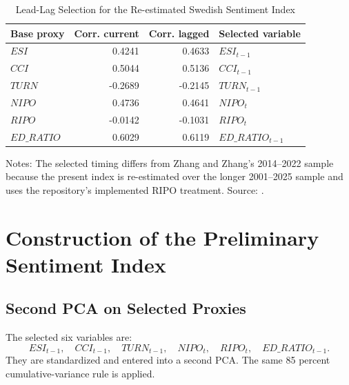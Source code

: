\documentclass[12pt]{article}
\begin{document}
\begin{table}[htbp]
\centering
\caption{Lead-Lag Selection for the Re-estimated Swedish Sentiment Index}
\label{tab:lead_lag_selection}
\begin{tabular}{lrrl}
\toprule
Base proxy & Corr. current & Corr. lagged & Selected variable \\
\midrule
\(ESI\) & 0.4241 & 0.4633 & \(ESI_{t-1}\) \\
\(CCI\) & 0.5044 & 0.5136 & \(CCI_{t-1}\) \\
\(TURN\) & -0.2689 & -0.2145 & \(TURN_{t-1}\) \\
\(NIPO\) & 0.4736 & 0.4641 & \(NIPO_t\) \\
\(RIPO\) & -0.0142 & -0.1031 & \(RIPO_t\) \\
\(ED\_RATIO\) & 0.6029 & 0.6119 & \(ED\_RATIO_{t-1}\) \\
\bottomrule
\end{tabular}
\begin{minipage}{0.95\textwidth}
\footnotesize
Notes: The selected timing differs from Zhang and Zhang's 2014--2022 sample because the present index is re-estimated over the longer 2001--2025 sample and uses the repository's implemented RIPO treatment. Source: .
\end{minipage}
\end{table}

\section{Construction of the Preliminary Sentiment Index}

\subsection{Second PCA on Selected Proxies}

The selected six variables are:
\[
ESI_{t-1},\quad CCI_{t-1},\quad TURN_{t-1},\quad NIPO_t,\quad RIPO_t,\quad ED\_RATIO_{t-1}.
\]
They are standardized and entered into a second PCA. The same 85 percent cumulative-variance rule is applied.
\end{document}
